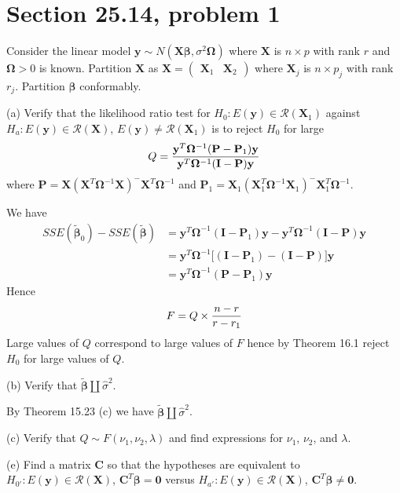 
\section{Section 25.14, problem 1}
Consider the linear model $\mathbf y\sim N(\mathbf X\bm\beta,
\sigma^2\bm\Omega)$ where $\mathbf X$ is $n\times p$ with rank
$r$ and $\bm\Omega>0$ is known.
Partition $\mathbf X$ as
$\mathbf X=\begin{pmatrix}\mathbf X_1 & \mathbf X_2\end{pmatrix}$
where $\mathbf X_j$ is $n\times p_j$ with rank $r_j$.
Partition $\bm\beta$ conformably.

\bigskip
\noindent
(a) Verify that the likelihood ratio test for
$H_0:E(\mathbf y)\in\mathcal R(\mathbf X_1)$ against
$H_a:E(\mathbf y)\in\mathcal R(\mathbf X)$,
$E(\mathbf y)\ne\mathcal R(\mathbf X_1)$ is to reject
$H_0$ for large
\[
Q={
\mathbf y^T\bm\Omega^{-1}(\mathbf P-\mathbf P_1)\mathbf y
\over
\mathbf y^T\bm\Omega^{-1}(\mathbf I-\mathbf P)\mathbf y
}
\]
where $\mathbf P=\mathbf X(\mathbf X^T\bm\Omega^{-1}\mathbf X)^{-{}}
\mathbf X^T\bm\Omega^{-1}$ and
$\mathbf P_1=\mathbf X_1(\mathbf X_1^T\bm\Omega^{-1}\mathbf X_1)^{-{}}
\mathbf X_1^T\bm\Omega^{-1}$.

\bigskip
\noindent
We have
\begin{align*}
SSE(\bm{\widetilde\beta}_0)-SSE(\bm{\widetilde\beta})
&=
\mathbf y^T\bm\Omega^{-1}(\mathbf I-\mathbf P_1)\mathbf y-
\mathbf y^T\bm\Omega^{-1}(\mathbf I-\mathbf P)\mathbf y\\
&=
\mathbf y^T\bm\Omega^{-1}\bigg[
(\mathbf I-\mathbf P_1)-(\mathbf I-\mathbf P)\bigg]\mathbf y\\
&=
\mathbf y^T\bm\Omega^{-1}(\mathbf P-\mathbf P_1)\mathbf y
\end{align*}
Hence
\[
F=Q\times{n-r\over r-r_1}
\]
Large values of $Q$ correspond to large values of $F$ hence
by Theorem 16.1 reject $H_0$ for large values of $Q$.

\bigskip
\noindent
(b) Verify that $\bm{\widetilde\beta}\amalg\widehat\sigma^2$.

\bigskip
\noindent
By Theorem 15.23 (c) we have
$\bm{\widetilde\beta}\amalg\widehat\sigma^2$.

\bigskip
\noindent
(c) Verify that $Q\sim F(\nu_1,\nu_2,\lambda)$ and find
expressions for $\nu_1$, $\nu_2$, and $\lambda$.

\bigskip
\noindent
(e) Find a matrix $\mathbf C$ so that the hypotheses are
equivalent to
$H_{0'}:E(\mathbf y)\in\mathcal R(\mathbf X)$,
$\mathbf C^T\bm\beta=\mathbf 0$ versus
$H_{a'}:E(\mathbf y)\in\mathcal R(\mathbf X)$,
$\mathbf C^T\bm\beta\ne\mathbf0$.

